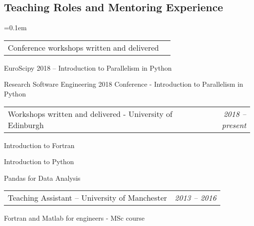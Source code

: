 \documentclass[10.5pt,a4]{article}
\makeatletter
\newcommand{\headerrow}[2]
{\begin{tabular*}{\linewidth}{l@{\extracolsep{\fill}}r}
	#1 &
	#2 \\
\end{tabular*}}
\makeatother
\begin{document}
\subsection*{Teaching Roles and Mentoring Experience} 
	\parskip=0.1em
\begin{itemize*}
	\item
	\headerrow
	{Conference workshops written and delivered}
	{}
	  \begin{itemize*}
	  \item EuroScipy 2018 -- Introduction to Parallelism in Python
	  \item Research Software Engineering 2018 Conference - Introduction to Parallelism in Python
	  \end{itemize*}

	\item
	\headerrow
	{Workshops written and delivered - University of Edinburgh}
	{\textit{2018 -- present}}
	  \begin{itemize*}
	  \item Introduction to Fortran
	  \item Introduction to Python
	  \item Pandas for Data Analysis
	  \end{itemize*}
	  


	\item
	\headerrow
	{Teaching Assistant -- University of Manchester}
	{\textit{2013 -- 2016}}
	  \begin{itemize*}
	  \item Fortran and Matlab for engineers - MSc course
	  \end{itemize*}
\end{itemize*}
\end{document}
